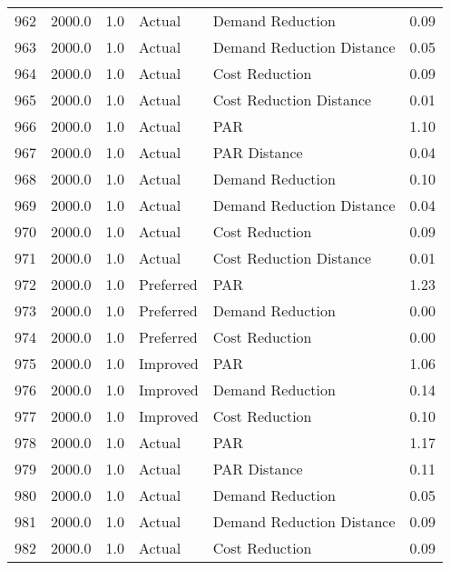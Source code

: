 \begin{longtable}{lrrllr}
962  &       2000.0 &     1.0 &         Actual &           Demand Reduction &   0.09 \\
963  &       2000.0 &     1.0 &         Actual &  Demand Reduction Distance &   0.05 \\
964  &       2000.0 &     1.0 &         Actual &             Cost Reduction &   0.09 \\
965  &       2000.0 &     1.0 &         Actual &    Cost Reduction Distance &   0.01 \\
966  &       2000.0 &     1.0 &         Actual &                        PAR &   1.10 \\
967  &       2000.0 &     1.0 &         Actual &               PAR Distance &   0.04 \\
968  &       2000.0 &     1.0 &         Actual &           Demand Reduction &   0.10 \\
969  &       2000.0 &     1.0 &         Actual &  Demand Reduction Distance &   0.04 \\
970  &       2000.0 &     1.0 &         Actual &             Cost Reduction &   0.09 \\
971  &       2000.0 &     1.0 &         Actual &    Cost Reduction Distance &   0.01 \\
972  &       2000.0 &     1.0 &      Preferred &                        PAR &   1.23 \\
973  &       2000.0 &     1.0 &      Preferred &           Demand Reduction &   0.00 \\
974  &       2000.0 &     1.0 &      Preferred &             Cost Reduction &   0.00 \\
975  &       2000.0 &     1.0 &       Improved &                        PAR &   1.06 \\
976  &       2000.0 &     1.0 &       Improved &           Demand Reduction &   0.14 \\
977  &       2000.0 &     1.0 &       Improved &             Cost Reduction &   0.10 \\
978  &       2000.0 &     1.0 &         Actual &                        PAR &   1.17 \\
979  &       2000.0 &     1.0 &         Actual &               PAR Distance &   0.11 \\
980  &       2000.0 &     1.0 &         Actual &           Demand Reduction &   0.05 \\
981  &       2000.0 &     1.0 &         Actual &  Demand Reduction Distance &   0.09 \\
982  &       2000.0 &     1.0 &         Actual &             Cost Reduction &   0.09 \\

\end{longtable}
